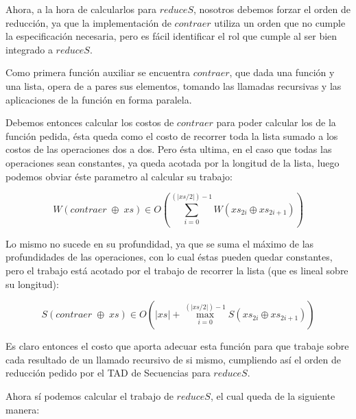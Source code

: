 \documentclass[a4paper,10pt]{article}
\begin{document}




    Ahora, a la hora de calcularlos para $reduceS$, nosotros debemos forzar
el orden de reducción, ya que la implementación de $contraer$ utiliza un orden
que no cumple la especificación necesaria, pero es fácil identificar el rol que
cumple al ser bien integrado a $reduceS$.

    Como primera función auxiliar se encuentra $contraer$, que dada una función y
una lista, opera de a pares sus elementos, tomando las llamadas recursivas y las 
aplicaciones de la función en forma paralela. 



    Debemos entonces calcular los costos de $contraer$ para poder calcular los de la 
función pedida, ésta queda como el costo de recorrer toda la lista sumado a los costos 
de las operaciones dos a dos. Pero ésta ultima, en el caso que todas las operaciones 
sean constantes, ya queda acotada por la longitud de la lista, luego podemos obviar 
éste parametro al calcular su trabajo:

\begin{equation*}
    W \left( contraer \;\oplus \;xs \right) \in
    O \left( \sum_{i=0}^{(\vert xs / 2 \vert) - 1} W \left( xs_{2i} \oplus xs_{2i+1} \right) \right)
\end{equation*}

    Lo mismo no sucede en su profundidad, ya que se suma el máximo de las profundidades
de las operaciones, con lo cual éstas pueden quedar constantes, pero el trabajo está 
acotado por el trabajo de recorrer la lista (que es lineal sobre su longitud):

\begin{equation*}
    S \left( contraer \;\oplus \;xs \right) \in
    O \left( \vert xs \vert + \max_{i=0}^{(\vert xs / 2 \vert) - 1} S \left( xs_{2i} \oplus xs_{2i+1} \right) \right)
\end{equation*}

\smallskip

    Es claro entonces el costo que aporta adecuar esta función para que trabaje sobre
cada resultado de un llamado recursivo de si mismo, cumpliendo así el orden de
reducción pedido por el TAD de Secuencias para $reduceS$.

    Ahora sí podemos calcular el trabajo de $reduceS$, el cual queda de la siguiente
manera: 
\end{document}
